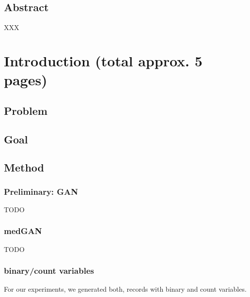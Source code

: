 \documentclass[11pt, a4paper]{book}
\def\blankpage{%
      \clearpage%
      \thispagestyle{empty}%
      \addtocounter{page}{-1}%
      \null%
      \clearpage}
\begin{document}
\pagestyle{fancy}
\thispagestyle{empty}
\renewcommand{\bibname}{References}

\renewcommand\theadfont{\normalsize}

\thispagestyle{empty}
\maketitle

\blankpage

\thispagestyle{empty}
\section*{Abstract}
XXX


\blankpage

\clearpage

\thispagestyle{empty}
\tableofcontents

\blankpage







\chapter{Introduction (total approx. 5 pages)}

\section{Problem}
\section{Goal}

\section{Method}
\subsection{Preliminary: GAN}
TODO
\subsection{medGAN}
TODO
\subsection{binary/count variables}
For our experiments, we generated both, records with binary and count variables. 
\end{document}
